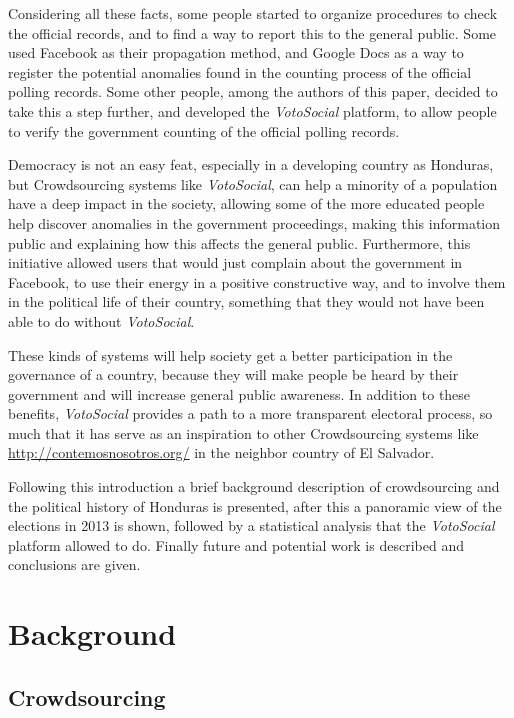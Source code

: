 \documentclass[a4paper,10pt]{article}
\begin{document}
Considering all these facts, some people started to organize procedures to check the official records, and to find a way to report this to the general public. Some used Facebook as their propagation method, and Google Docs as a way to register the potential anomalies found in the counting process of the official polling records. Some other people, among the authors of this paper, decided to take this a step further, and developed the \textit{VotoSocial} platform, to allow people to verify the government counting of the official polling records.

Democracy is not an easy feat, especially in a developing country as Honduras, but Crowdsourcing systems like \textit{VotoSocial}, can help a minority of a population have a deep impact in the society, allowing some of the more educated people help discover anomalies in the government proceedings, making this information public and explaining how this affects the general public. Furthermore, this initiative allowed users that would just complain about the government in Facebook, to use their energy in a positive constructive way, and to involve them in the political life of their country, something that they would not have been able to do without \textit{VotoSocial}.

These kinds of systems will help society get a better participation in the governance of a country, because they will make people be heard by their government and will increase general public awareness. In addition to these benefits, \textit{VotoSocial} provides a path to a more transparent electoral process, so much that it has serve as an inspiration to other Crowdsourcing systems like \url{http://contemosnosotros.org/} in the neighbor country of El Salvador. 

Following this introduction a brief background description of crowdsourcing and the political history of Honduras is presented, after this a panoramic view of the elections in 2013 is shown, followed by a statistical analysis that the \textit{VotoSocial} platform allowed to do. Finally future and potential work is described and conclusions are given.


\section{Background}

\subsection{Crowdsourcing}
\end{document}
